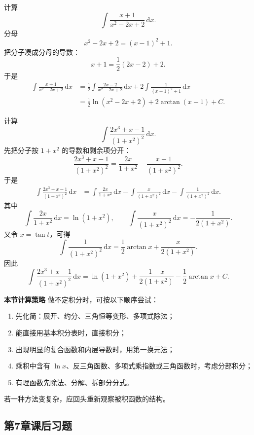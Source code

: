 \documentclass[fontset=fandol]{ctexart}
\newenvironment{custom}[1]{\par\noindent\textbf{#1}\quad}{\par\vspace{0.8em}}
\newcommand{\dd}{\mathrm{d}}
\begin{document}
\begin{example}[不可约二次因子]
计算
\[
\int \frac{x+1}{x^2-2x+2}\,\dd x.
\]
分母
\[
x^2-2x+2=(x-1)^2+1.
\]
把分子凑成分母的导数：
\[
x+1=\frac12(2x-2)+2.
\]
于是
\[
\begin{aligned}
\int \frac{x+1}{x^2-2x+2}\,\dd x
&=\frac12\int\frac{2x-2}{x^2-2x+2}\,\dd x
  +2\int\frac{1}{(x-1)^2+1}\,\dd x\\
&=\frac12\ln(x^2-2x+2)+2\arctan(x-1)+C.
\end{aligned}
\]
\end{example}

\begin{example}[二次因子的平方]
计算
\[
\int \frac{2x^3+x-1}{(1+x^2)^2}\,\dd x.
\]
先把分子按 $1+x^2$ 的导数和剩余项分开：
\[
\frac{2x^3+x-1}{(1+x^2)^2}
=\frac{2x}{1+x^2}-\frac{x+1}{(1+x^2)^2}.
\]
于是
\[
\begin{aligned}
\int \frac{2x^3+x-1}{(1+x^2)^2}\,\dd x
&=\int\frac{2x}{1+x^2}\,\dd x
-\int\frac{x}{(1+x^2)^2}\,\dd x
-\int\frac{1}{(1+x^2)^2}\,\dd x.
\end{aligned}
\]
其中
\[
\int\frac{2x}{1+x^2}\,\dd x=\ln(1+x^2),
\qquad
\int\frac{x}{(1+x^2)^2}\,\dd x=-\frac{1}{2(1+x^2)}.
\]
又令 $x=\tan t$，可得
\[
\int\frac{1}{(1+x^2)^2}\,\dd x
=\frac12\arctan x+\frac{x}{2(1+x^2)}.
\]
因此
\[
\int \frac{2x^3+x-1}{(1+x^2)^2}\,\dd x
=\ln(1+x^2)+\frac{1-x}{2(1+x^2)}-\frac12\arctan x+C.
\]
\end{example}

\begin{custom}{本节计算策略}
做不定积分时，可按以下顺序尝试：
\begin{enumerate}
\item 先化简：展开、约分、三角恒等变形、多项式除法；
\item 能直接用基本积分表时，直接积分；
\item 出现明显的复合函数和内层导数时，用第一换元法；
\item 乘积中含有 $\ln x$、反三角函数、多项式乘指数或三角函数时，考虑分部积分；
\item 有理函数先除法、分解、拆部分分式。
\end{enumerate}
若一种方法变复杂，应回头重新观察被积函数的结构。
\end{custom}

\clearpage

\iffalse

\subsection*{第7章课后习题}
\end{document}
